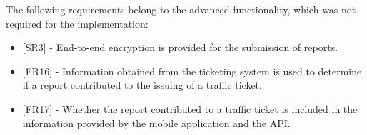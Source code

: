 The following requirements belong to the advanced functionality, which was not required for the implementation:

\begin{itemize}[label={}]
            \item {[SR3]} - End-to-end encryption is provided for the submission of reports. 
            \item {[FR16]} - Information obtained from the ticketing system is used to determine if a report contributed to the issuing of a traffic ticket.
            \item {[FR17]} - Whether the report contributed to a traffic ticket is included in the information provided by the mobile application and the API.
\end{itemize}